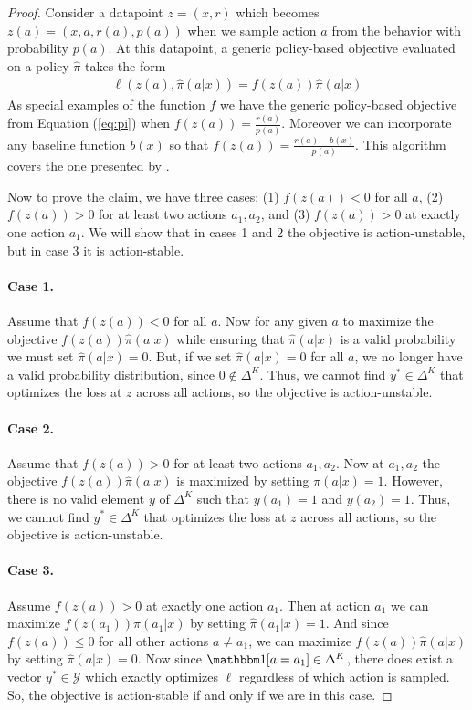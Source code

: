 \begin{proof}
Consider a datapoint $ z= (x,r)$ which becomes $ z(a) = (x, a, r(a), p(a))$ when we sample action $ a$ from the behavior with probability $ p(a)$. At this datapoint, a generic policy-based objective evaluated on a policy $ \hat \pi $ takes the form
\begin{align}
    \ell(z(a), \hat \pi(a|x)) = f(z(a)) \hat \pi(a|x)
\end{align}
As special examples of the function $ f $ we have the generic policy-based objective from Equation (\ref{eq:pi}) when $ f(z(a)) = \frac{r(a)}{p(a)}$. Moreover we can incorporate any baseline function $ b(x)$ so that $ f(z(a)) = \frac{r(a) - b(x)}{p(a)}$. This algorithm covers the one presented by \citet{joachims2018deep}.

Now to prove the claim, we have three cases: (1) $ f(z(a)) < 0$ for all $ a$, (2) $ f(z(a)) > 0 $ for at least two actions $ a_1, a_2$, and (3) $ f(z(a)) > 0$ at exactly one action $ a_1$. We will show that in cases 1 and 2 the objective is action-unstable, but in case 3 it is action-stable.

\paragraph{Case 1.} Assume that $ f(z(a)) < 0$ for all $ a$. Now for any given $ a $ to maximize the objective $f(z(a))\hat \pi(a|x)$ while ensuring that $ \hat \pi(a|x) $ is a valid probability we must set $ \hat \pi(a|x) = 0$. But, if we set $ \hat\pi(a|x) = 0$ for all $ a$, we no longer have a valid probability distribution, since $ 0 \not \in \Delta^K$. Thus, we cannot find $ y^* \in \Delta^K$ that optimizes the loss at $ z $ across all actions, so the objective is action-unstable.

\paragraph{Case 2.} Assume that $ f(z(a)) > 0 $ for at least two actions $ a_1, a_2$. Now at $ a_1, a_2$ the objective $f(z(a))\hat \pi(a|x)$ is maximized by setting $ \pi(a|x) = 1$. However, there is no valid element $ y $ of $ \Delta^K$ such that $ y(a_1) = 1$ and $y(a_2) = 1$. Thus, we cannot find $ y^* \in \Delta^K$ that optimizes the loss at $ z $ across all actions, so the objective is action-unstable.

\paragraph{Case 3.} Assume $f(z(a)) > 0$ at exactly one action $ a_1$. Then at action $ a_1$ we can maximize $ f(z(a_1))\hat \pi(a_1|x)$ by setting $ \hat\pi(a_1|x) = 1$. And since $ f(z(a)) \leq 0$ for all other actions $ a \neq a_1$, we can maximize $ f(z(a))\hat \pi(a|x)$ by setting $ \hat\pi(a|x) = 0$. Now since $ \one[a = a_1] \in \Delta^K$, there does exist a vector $ y^* \in \mathcal{Y}$ which exactly optimizes $ \ell$ regardless of which action is sampled. So, the objective is action-stable if and only if we are in this case.
\end{proof}




